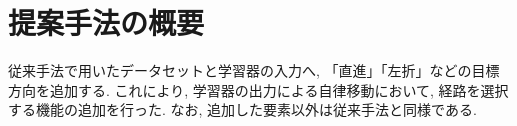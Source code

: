 
\section{提案手法の概要}
従来手法で用いたデータセットと学習器の入力へ, 「直進」「左折」などの目標方向を追加する. これにより, 学習器の出力による自律移動において, 経路を選択する機能の追加を行った. なお, 追加した要素以外は従来手法と同様である.



\newpage
